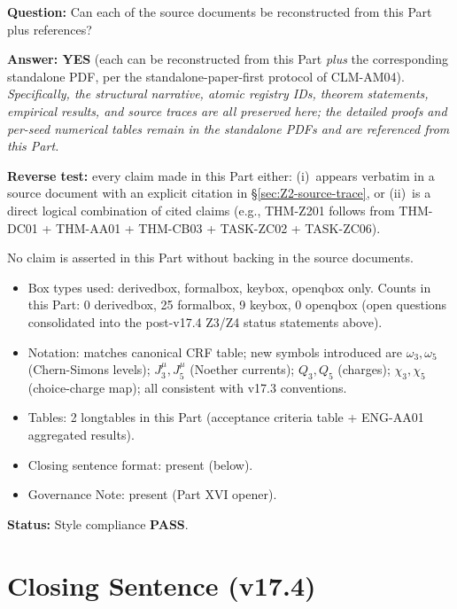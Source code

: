 \documentclass[12pt, a4paper]{article}
\begin{document}
\begin{formalbox}[title={Reconstruction Test (CUIP STEP 7)}]
\textbf{Question:} Can each of the source documents be
reconstructed from this Part plus references?

\textbf{Answer: YES} (each can be reconstructed from this Part
\emph{plus} the corresponding standalone PDF, per the
standalone-paper-first protocol of CLM-AM04). \emph{Specifically,
the structural narrative, atomic registry IDs, theorem statements,
empirical results, and source traces are all preserved here; the
detailed proofs and per-seed numerical tables remain in the
standalone PDFs and are referenced from this Part.}

\textbf{Reverse test:} every claim made in this Part either:
(i)~appears verbatim in a source document with an explicit citation
in \S\ref{sec:Z2-source-trace}, or
(ii)~is a direct logical combination of cited claims (e.g.,
THM-Z201 follows from THM-DC01 + THM-AA01 + THM-CB03 +
TASK-ZC02 + TASK-ZC06).

No claim is asserted in this Part without backing in the source
documents.
\end{formalbox}

\begin{formalbox}[title={Style Compliance Check (CUIP STEP 10)}]
\begin{itemize}[leftmargin=*]
\item Box types used: derivedbox, formalbox, keybox, openqbox only.
  Counts in this Part: 0 derivedbox, 25 formalbox, 9 keybox,
  0 openqbox (open questions consolidated into the post-v17.4
  Z3/Z4 status statements above).
\item Notation: matches canonical CRF table; new symbols introduced
  are $\omega_3, \omega_5$ (Chern-Simons levels); $J^\mu_3, J^\mu_5$
  (Noether currents); $Q_3, Q_5$ (charges); $\chi_3, \chi_5$
  (choice-charge map); all consistent with v17.3 conventions.
\item Tables: 2 longtables in this Part (acceptance criteria
  table + ENG-AA01 aggregated results).
\item Closing sentence format: present (below).
\item Governance Note: present (Part XVI opener).
\end{itemize}
\textbf{Status:} Style compliance \textbf{PASS}.
\end{formalbox}

\section{Closing Sentence (v17.4)}
\end{document}
